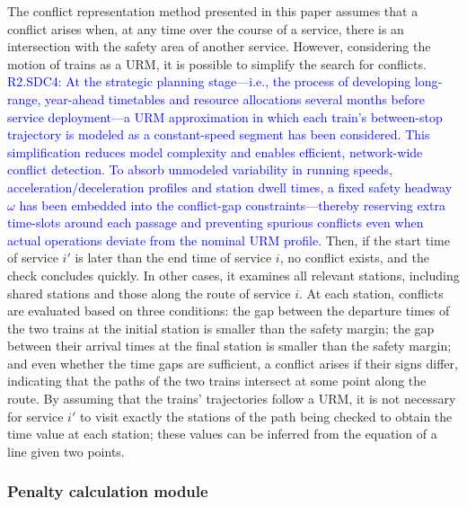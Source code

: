 \documentclass[Afour,sagev,times]{sagej}
\newcommand{\segundo}[1]{\textcolor{blue}{#1}}
\begin{document}
The conflict representation method presented in this paper assumes that a conflict arises when, at any time over the course of a service, there is an intersection with the safety area of another service. However, considering the motion of trains as a \gls{URM}, it is possible to simplify the search for conflicts. \segundo{R2.SDC4: At the strategic planning stage—i.e., the process of developing long‐range, year-ahead timetables and resource allocations several months before service deployment—a \gls{URM} approximation in which each train’s between-stop trajectory is modeled as a constant-speed segment has been considered. This simplification reduces model complexity and enables efficient, network-wide conflict detection. To absorb unmodeled variability in running speeds, acceleration/deceleration profiles and station dwell times, a fixed safety headway $\omega$ has been embedded into the conflict-gap constraints—thereby reserving extra time-slots around each passage and preventing spurious conflicts even when actual operations deviate from the nominal \gls{URM} profile.} Then, if the start time of service \(i'\) is later than the end time of service \(i\), no conflict exists, and the check concludes quickly. In other cases, it examines all relevant stations, including shared stations and those along the route of service \(i\). At each station, conflicts are evaluated based on three conditions: the gap between the departure times of the two trains at the initial station is smaller than the safety margin; the gap between their arrival times at the final station is smaller than the safety margin; and even whether the time gaps are sufficient, a conflict arises if their signs differ, indicating that the paths of the two trains intersect at some point along the route. By assuming that the trains' trajectories follow a \gls{URM},  it is not necessary for service $i'$ to visit exactly the stations of the path being checked to obtain the time value at each station; these values can be inferred from the equation of a line given two points. %

\subsubsection{Penalty calculation module}
\label{sec:penalty_calculation_module}

\end{document}
